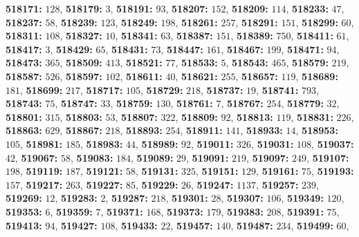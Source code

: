 \textsf{\bfseries 518171:} $128$, \textsf{\bfseries 518179:} $3$, \textsf{\bfseries 518191:} $93$, \textsf{\bfseries 518207:} $152$, \textsf{\bfseries 518209:} $114$, \textsf{\bfseries 518233:} $47$, \textsf{\bfseries 518237:} $58$, \textsf{\bfseries 518239:} $123$, \textsf{\bfseries 518249:} $198$, \textsf{\bfseries 518261:} $257$, \textsf{\bfseries 518291:} $151$, \textsf{\bfseries 518299:} $60$, \textsf{\bfseries 518311:} $108$, \textsf{\bfseries 518327:} $10$, \textsf{\bfseries 518341:} $63$, \textsf{\bfseries 518387:} $151$, \textsf{\bfseries 518389:} $750$, \textsf{\bfseries 518411:} $61$, \textsf{\bfseries 518417:} $3$, \textsf{\bfseries 518429:} $65$, \textsf{\bfseries 518431:} $73$, \textsf{\bfseries 518447:} $161$, \textsf{\bfseries 518467:} $199$, \textsf{\bfseries 518471:} $94$, \textsf{\bfseries 518473:} $365$, \textsf{\bfseries 518509:} $413$, \textsf{\bfseries 518521:} $77$, \textsf{\bfseries 518533:} $5$, \textsf{\bfseries 518543:} $465$, \textsf{\bfseries 518579:} $219$, \textsf{\bfseries 518587:} $526$, \textsf{\bfseries 518597:} $102$, \textsf{\bfseries 518611:} $40$, \textsf{\bfseries 518621:} $255$, \textsf{\bfseries 518657:} $119$, \textsf{\bfseries 518689:} $181$, \textsf{\bfseries 518699:} $217$, \textsf{\bfseries 518717:} $105$, \textsf{\bfseries 518729:} $218$, \textsf{\bfseries 518737:} $19$, \textsf{\bfseries 518741:} $793$, \textsf{\bfseries 518743:} $75$, \textsf{\bfseries 518747:} $33$, \textsf{\bfseries 518759:} $130$, \textsf{\bfseries 518761:} $7$, \textsf{\bfseries 518767:} $254$, \textsf{\bfseries 518779:} $32$, \textsf{\bfseries 518801:} $315$, \textsf{\bfseries 518803:} $53$, \textsf{\bfseries 518807:} $322$, \textsf{\bfseries 518809:} $92$, \textsf{\bfseries 518813:} $119$, \textsf{\bfseries 518831:} $226$, \textsf{\bfseries 518863:} $629$, \textsf{\bfseries 518867:} $218$, \textsf{\bfseries 518893:} $254$, \textsf{\bfseries 518911:} $141$, \textsf{\bfseries 518933:} $14$, \textsf{\bfseries 518953:} $105$, \textsf{\bfseries 518981:} $185$, \textsf{\bfseries 518983:} $44$, \textsf{\bfseries 518989:} $92$, \textsf{\bfseries 519011:} $326$, \textsf{\bfseries 519031:} $108$, \textsf{\bfseries 519037:} $42$, \textsf{\bfseries 519067:} $58$, \textsf{\bfseries 519083:} $184$, \textsf{\bfseries 519089:} $29$, \textsf{\bfseries 519091:} $219$, \textsf{\bfseries 519097:} $249$, \textsf{\bfseries 519107:} $198$, \textsf{\bfseries 519119:} $187$, \textsf{\bfseries 519121:} $58$, \textsf{\bfseries 519131:} $325$, \textsf{\bfseries 519151:} $129$, \textsf{\bfseries 519161:} $75$, \textsf{\bfseries 519193:} $157$, \textsf{\bfseries 519217:} $263$, \textsf{\bfseries 519227:} $85$, \textsf{\bfseries 519229:} $26$, \textsf{\bfseries 519247:} $1137$, \textsf{\bfseries 519257:} $239$, \textsf{\bfseries 519269:} $12$, \textsf{\bfseries 519283:} $2$, \textsf{\bfseries 519287:} $218$, \textsf{\bfseries 519301:} $28$, \textsf{\bfseries 519307:} $106$, \textsf{\bfseries 519349:} $120$, \textsf{\bfseries 519353:} $6$, \textsf{\bfseries 519359:} $7$, \textsf{\bfseries 519371:} $168$, \textsf{\bfseries 519373:} $179$, \textsf{\bfseries 519383:} $208$, \textsf{\bfseries 519391:} $75$, \textsf{\bfseries 519413:} $94$, \textsf{\bfseries 519427:} $108$, \textsf{\bfseries 519433:} $22$, \textsf{\bfseries 519457:} $140$, \textsf{\bfseries 519487:} $234$, \textsf{\bfseries 519499:} $60$, 
